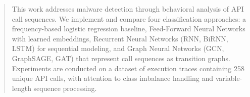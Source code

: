 
\begin{abstract}

    This work addresses malware detection through behavioral analysis of API call sequences. We implement and compare four classification approaches: a frequency-based logistic regression baseline, Feed-Forward Neural Networks with learned embeddings, Recurrent Neural Networks (RNN, BiRNN, LSTM) for sequential modeling, and Graph Neural Networks (GCN, GraphSAGE, GAT) that represent call sequences as transition graphs. Experiments are conducted on a dataset of execution traces containing 258 unique API calls, with attention to class imbalance handling and variable-length sequence processing.
    
\end{abstract}
